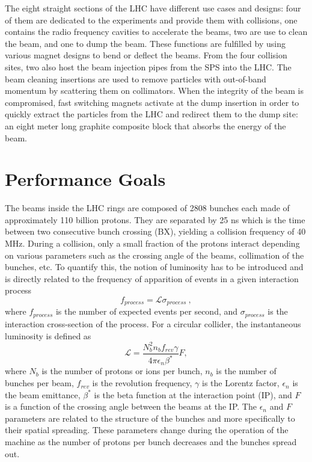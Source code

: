     The eight straight sections of the LHC have different use cases and designs: four of them are dedicated to the experiments and provide them with collisions, one contains the radio frequency cavities to accelerate the beams, two are use to clean the beam, and one to dump the beam. These functions are fulfilled by using various magnet designs to bend or deflect the beams. From the four collision sites, two also host the beam injection pipes from the SPS into the LHC. The beam cleaning insertions are used to remove particles with out-of-band momentum by scattering them on collimators. When the integrity of the beam is compromised, fast switching magnets activate at the dump insertion in order to quickly extract the particles from the LHC and redirect them to the dump site: an eight meter long graphite composite block that absorbs the energy of the beam.

	\section{Performance Goals}

  	The beams inside the LHC rings are composed of 2808 bunches each made of approximately 110 billion protons. They are separated by 25 ns which is the time between two consecutive bunch crossing (BX), yielding a collision frequency of 40 MHz. During a collision, only a small fraction of the protons interact depending on various parameters such as the crossing angle of the beams, collimation of the bunches, etc. To quantify this, the notion of luminosity has to be introduced and is directly related to the frequency of apparition of events in a given interaction process
  	\begin{equation}
  		f_{process} = \mathcal{L} \sigma_{process} \ ,
  	\end{equation}
  	where $ f_{process} $ is the number of expected events per second, and $ \sigma_{process} $ is the interaction cross-section of the process. For a circular collider, the instantaneous luminosity is defined as
  	\begin{equation}
  		\mathcal{L} = \frac{N^2_b n_b f_{rev} \gamma}{4 \pi \epsilon_n \beta^*} F ,
  	\end{equation}
  	where $ N_b $ is the number of protons or ions per bunch, $ n_b $ is the number of bunches per beam, $ f_{rev} $ is the revolution frequency, $ \gamma $ is the Lorentz factor, $ \epsilon_n $ is the beam emittance, $ \beta^* $ is the beta function at the interaction point (IP), and $ F $ is a function of the crossing angle between the beams at the IP. The $ \epsilon_n $ and $ F $ parameters are related to the structure of the bunches and more specifically to their spatial spreading. These parameters change during the operation of the machine as the number of protons per bunch decreases and the bunches spread out. \\

